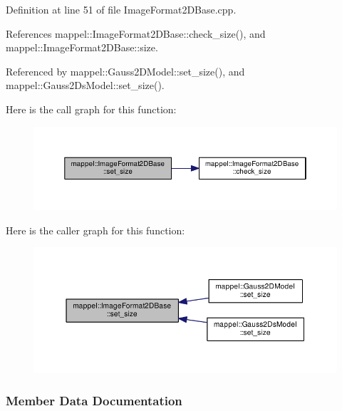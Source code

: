 Definition at line 51 of file Image\+Format2\+D\+Base.\+cpp.



References mappel\+::\+Image\+Format2\+D\+Base\+::check\+\_\+size(), and mappel\+::\+Image\+Format2\+D\+Base\+::size.



Referenced by mappel\+::\+Gauss2\+D\+Model\+::set\+\_\+size(), and mappel\+::\+Gauss2\+Ds\+Model\+::set\+\_\+size().



Here is the call graph for this function\+:\nopagebreak
\begin{figure}[H]
\begin{center}
\leavevmode
\includegraphics[width=350pt]{classmappel_1_1ImageFormat2DBase_afb0cba98e353625641646506aeb80372_cgraph}
\end{center}
\end{figure}




Here is the caller graph for this function\+:\nopagebreak
\begin{figure}[H]
\begin{center}
\leavevmode
\includegraphics[width=350pt]{classmappel_1_1ImageFormat2DBase_afb0cba98e353625641646506aeb80372_icgraph}
\end{center}
\end{figure}




\subsubsection{Member Data Documentation}
